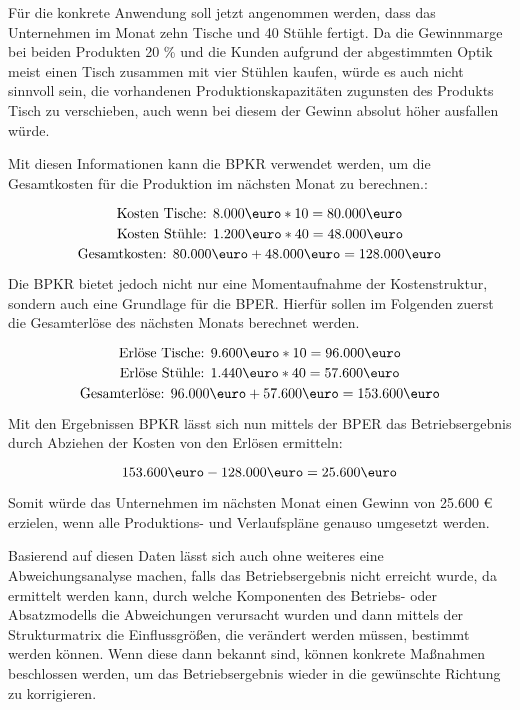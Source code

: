 Für die konkrete Anwendung soll jetzt angenommen werden, dass das Unternehmen im Monat zehn Tische und 40 Stühle fertigt. Da die Gewinnmarge bei beiden Produkten 20 \% und die Kunden aufgrund der abgestimmten Optik meist einen Tisch zusammen mit vier Stühlen kaufen, würde es auch nicht sinnvoll sein, die vorhandenen Produktionskapazitäten zugunsten des Produkts Tisch zu verschieben, auch wenn bei diesem der Gewinn absolut höher ausfallen würde.

Mit diesen Informationen kann die BPKR verwendet werden, um die Gesamtkosten für die Produktion im nächsten Monat zu berechnen.:

\[ \text{Kosten Tische: } 8.000 \text{\euro} * 10 = 80.000 \text{\euro} \]
\[ \text{Kosten Stühle: } 1.200 \text{\euro} * 40 = 48.000 \text{\euro} \]
\[ \text{Gesamtkosten: } 80.000 \text{\euro} + 48.000 \text{\euro} = 128.000 \text{\euro} \]

Die BPKR bietet jedoch nicht nur eine Momentaufnahme der Kostenstruktur, sondern auch eine Grundlage für die BPER. Hierfür sollen im Folgenden zuerst die Gesamterlöse des nächsten Monats berechnet werden.

\[ \text{Erlöse Tische: } 9.600 \text{\euro} * 10 = 96.000 \text{\euro} \]
\[ \text{Erlöse Stühle: } 1.440 \text{\euro} * 40 = 57.600 \text{\euro} \]
\[ \text{Gesamterlöse: } 96.000 \text{\euro} + 57.600 \text{\euro} = 153.600 \text{\euro} \]

Mit den Ergebnissen BPKR lässt sich nun mittels der BPER das Betriebsergebnis durch Abziehen der Kosten von den Erlösen ermitteln:

\[ 153.600 \text{\euro} - 128.000 \text{\euro} = 25.600 \text{\euro} \]

Somit würde das Unternehmen im nächsten Monat einen Gewinn von 25.600 {\euro} erzielen, wenn alle Produktions- und Verlaufspläne genauso umgesetzt werden.

Basierend auf diesen Daten lässt sich auch ohne weiteres eine Abweichungsanalyse machen, falls das Betriebsergebnis nicht erreicht wurde, da ermittelt werden kann, durch welche Komponenten des Betriebs- oder Absatzmodells die Abweichungen verursacht wurden und dann mittels der Strukturmatrix die Einflussgrö{\ss}en, die verändert werden müssen, bestimmt werden können. Wenn diese dann bekannt sind, können konkrete Ma{\ss}nahmen beschlossen werden, um das Betriebsergebnis wieder in die gewünschte Richtung zu korrigieren.